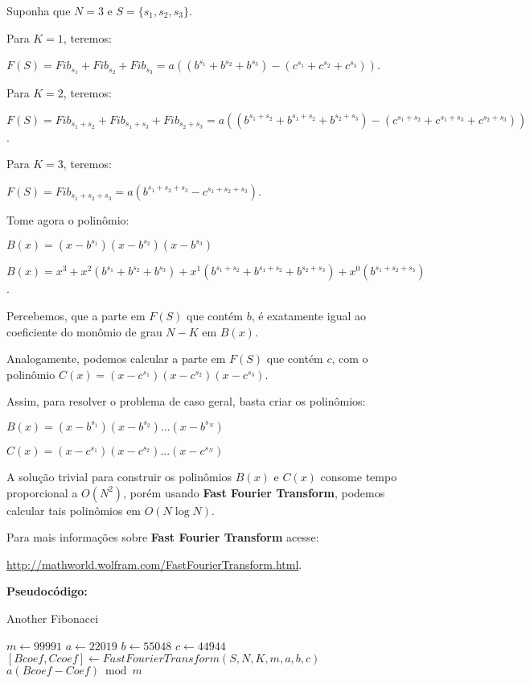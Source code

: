 Suponha que $N=3$ e $S=\{s_1, s_2, s_3\}$. 

Para $K=1$, teremos:

$F(S) = Fib_{s_1}+Fib_{s_2}+Fib_{s_3} = a((b^{s_1}+b^{s_2}+b^{s_3}) - (c^{s_1}+c^{s_2}+c^{s_3}))$.

Para $K=2$, teremos:

$F(S) = Fib_{s_1+s_2}+Fib_{s_1+s_3}+Fib_{s_2+s_3} = a((b^{s_1+s_2}+b^{s_1+s_2}+b^{s_2+s_3}) - (c^{s_1+s_2}+c^{s_1+s_3}+c^{s_2+s_3}))$.

Para $K=3$, teremos:

$F(S) = Fib_{s_1+s_2+s_3} = a(b^{s_1+s_2+s_3} - c^{s_1+s_2+s_3})$.
\newline

Tome agora o polinômio: 

$B(x) = (x-b^{s_1})(x-b^{s_2})(x-b^{s_3})$

$B(x) = x^3 + x^2(b^{s_1}+b^{s_2}+b^{s_3}) + x^1(b^{s_1+s_2}+b^{s_1+s_2}+b^{s_2+s_3}) + x^0(b^{s_1+s_2+s_3})$.

Percebemos, que a parte em $F(S)$ que contém $b$, é exatamente igual ao coeficiente do monômio de grau $N-K$ em $B(x)$.

Analogamente, podemos calcular a parte em $F(S)$ que contém $c$, com o polinômio $C(x) = (x-c^{s_1})(x-c^{s_2})(x-c^{s_3})$.
\newline

Assim, para resolver o problema de caso geral, basta criar os polinômios:

$B(x) = (x-b^{s_1})(x-b^{s_2})...(x-b^{s_N})$

$C(x) = (x-c^{s_1})(x-c^{s_2})...(x-c^{s_N})$
\newline

A solução trivial para construir os polinômios $B(x)$ e $C(x)$ consome tempo proporcional a $O(N^2)$, porém usando 
\textbf{Fast Fourier Transform}, podemos calcular tais polinômios em $O(N\log N)$.
\newline

Para mais informações sobre  \textbf{Fast Fourier Transform} acesse:

\href{http://mathworld.wolfram.com/FastFourierTransform.html}{http://mathworld.wolfram.com/FastFourierTransform.html}.
\newline

\textbf{Pseudocódigo:}
\begin{algorithm}
\caption{Another Fibonacci}
\begin{algorithmic}[1]
\State $m \gets 99991$
\State $a \gets 22019$
\State $b \gets 55048$
\State $c \gets 44944$
\\
\State $[Bcoef, Ccoef]\gets FastFourierTransform(S,N,K,m,a,b,c)$ 
\\
\State \Return $a(Bcoef - Coef)\bmod m$

\EndProcedure
\end{algorithmic}
\end{algorithm}


